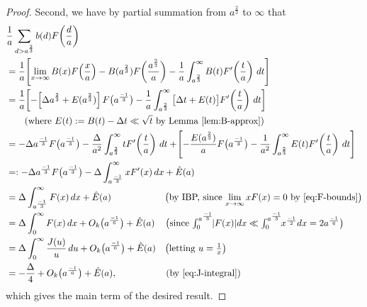 \documentclass[12pt,letterpaper,reqno]{amsart}
\theoremstyle{plain}
\theoremstyle{definition}
\numberwithin{equation}{section}
\numberwithin{figure}{section}
\numberwithin{table}{section}
\newcommand{\lrp}[1]{\!\left(#1\right)}
\newcommand{\lrb}[1]{\!\left[#1\right]}
\begin{document}
\begin{proof}
Second, we have by partial summation from $a^\frac{2}{3}$ to $\infty$ that
\begin{align}
&\frac1a\sum_{d>a^{\frac{2}{3}}}b(d)F\lrp{\frac{d}{a}} \\
&=
\frac{1}{a}
\lrb{
    \lim_{x\to\infty} B(x) F\lrp{\frac{x}{a}}
    -B(a^{\frac{2}{3}}) F\bigg(\frac{a^\frac{2}{3}}{a}\bigg)
    -\frac1{a}\int_{a^{\frac{2}{3}}}^\infty B(t)F'\lrp{\frac{t}{a}}\,dt
}
\\
&=
\frac{1}{a}
\lrb{
    -\lrb{\Delta a^{\frac{2}{3}} + E(a^{\frac{2}{3}}) } F\big(a^{\frac{-1}{3}}\big)
    -\frac1{a}\int_{a^{\frac{2}{3}}}^\infty \big[\Delta t + E(t)\big] F'\lrp{\frac{t}{a}}\,dt
}
\\
& \qquad \text{(where $E(t) := B(t) - \Delta t \ll \sqrt t$ by Lemma \ref{lem:B-approx})} \\
&= - \Delta a^{\frac{-1}{3}} F\big(a^{\frac{-1}{3}}\big) - \frac{\Delta}{a^2} \int_{a^{\frac{2}{3}}}^\infty t F'\lrp{\frac{t}{a}}\,dt + \lrb{
    -\frac{E(a^{\frac{2}{3}})}{a} F\big(a^{\frac{-1}{3}}\big)
    - \frac{1}{a^2} \int_{a^{\frac{2}{3}}}^\infty E(t) F'\lrp{\frac{t}{a}}\,dt
} 
\\
&=:
- \Delta a^{\frac{-1}{3}} F\big(a^{\frac{-1}{3}}\big)
-\Delta\int_{a^{\frac{-1}{3}}}^\infty x F'(x)\,dx
+ \hat E(a) 
\\
&=
\Delta\int_{a^{\frac{-1}{3}}}^\infty F(x)\,dx
+ \hat E(a)
\qquad\qquad\quad\ \ \,
\text{\big(by IBP, since $\lim_{x \to \infty} xF(x) = 0$ by \eqref{eq:F-bounds}\big)}
\\
&= \Delta\int_0^\infty F(x)\,dx
+O_k\big(a^{\frac{-1}{6}}\big) +\hat E(a)
\quad\,
\text{\big(since 
  $\textstyle
    \int_0^{a^{\frac{-1}{3}}} \!\lvert F(x)\rvert dx
    \ll
    \int_0^{a^{\frac{-1}{3}}} \!\!x^{\frac{-1}{2}}dx
    =
    2a^{\frac{-1}{6}}
  $\big)} 
\\
&=
\Delta\int_0^\infty \frac{J(u)}{u}\,du
+O_k\big(a^{\frac{-1}{6}}\big) + \hat E(a)
\quad
\text{\big(letting $u=\tfrac{1}{x}$\big)}
\\
&=
-\frac{\Delta}{4}
+O_k\big(a^{\frac{-1}{6}}\big) + \hat E(a),
\qquad\qquad\quad\ 
\text{(by \eqref{eq:J-integral})}
\end{align}
which gives the main term of the desired result.







\end{proof}
\end{document}
